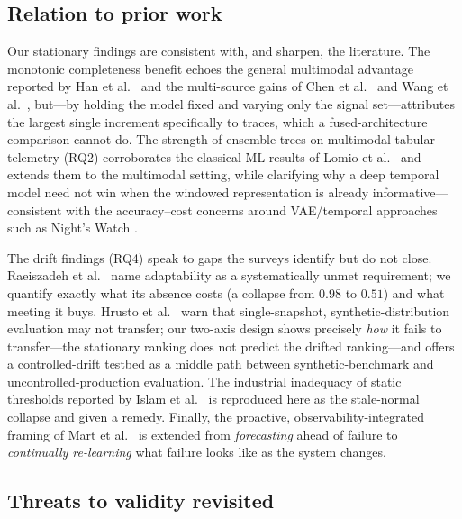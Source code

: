 \documentclass[acmsmall]{acmart}
\begin{document}
\subsection{Relation to prior work}\label{sec:disc-prior}

Our stationary findings are consistent with, and sharpen, the literature. The monotonic completeness benefit echoes the general multimodal advantage reported by Han et al.\ \cite{han2024} and the multi-source gains of Chen et al.\ \cite{chen2025} and Wang et al.\ \cite{wang2018}, but---by holding the model fixed and varying only the signal set---attributes the largest single increment specifically to traces, which a fused-architecture comparison cannot do. The strength of ensemble trees on multimodal tabular telemetry (RQ2) corroborates the classical-ML results of Lomio et al.\ \cite{lomio2022} and extends them to the multimodal setting, while clarifying why a deep temporal model need not win when the windowed representation is already informative---consistent with the accuracy--cost concerns around VAE/temporal approaches such as Night's Watch \cite{dkmak2025}.

The drift findings (RQ4) speak to gaps the surveys identify but do not close. Raeiszadeh et al.\ \cite{raeiszadeh2026} name adaptability as a systematically unmet requirement; we quantify exactly what its absence costs (a collapse from $0.98$ to $0.51$) and what meeting it buys. Hrusto et al.\ \cite{hrusto2026} warn that single-snapshot, synthetic-distribution evaluation may not transfer; our two-axis design shows precisely \emph{how} it fails to transfer---the stationary ranking does not predict the drifted ranking---and offers a controlled-drift testbed as a middle path between synthetic-benchmark and uncontrolled-production evaluation. The industrial inadequacy of static thresholds reported by Islam et al.\ \cite{islam2021} is reproduced here as the stale-normal collapse and given a remedy. Finally, the proactive, observability-integrated framing of Mart et al.\ \cite{mart2020} is extended from \emph{forecasting} ahead of failure to \emph{continually re-learning} what failure looks like as the system changes.

\subsection{Threats to validity revisited}\label{sec:disc-threats}
\end{document}
